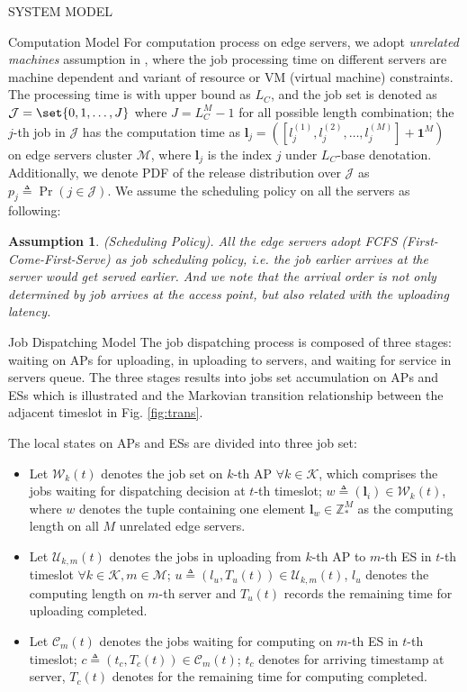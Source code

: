 \documentclass[10pt, conference, letterpaper]{IEEEtran}
\newtheorem{assumption}{Assumption}
\newcommand{\domZ}{\mathbb{Z}_{*}}
\newcommand{\vecOne}{\mathbf{1}}
\newcommand{\define}{\triangleq}
\renewcommand{\vec}{\mathbf}
\DeclarePairedDelimiter\set\{\}
\newcommand{\apSet}{\mathcal{K}}
\newcommand{\esSet}{\mathcal{M}}
\newcommand{\jSet}{\mathcal{J}}
\newcommand{\wSet}{\mathcal{W}}
\newcommand{\uSet}{\mathcal{U}}
\newcommand{\cSet}{\mathcal{C}}
\begin{document}
\begin{section}{SYSTEM MODEL}
        \begin{subsection}{Computation Model}
            For computation process on edge servers, we adopt \emph{unrelated machines} assumption in \cite{tan-online}, where the job processing time on different servers are machine dependent and variant of resource or VM (virtual machine) constraints. The processing time is with upper bound as $L_C$, and the job set is denoted as $\mathcal{J} = \set{0,1,\dots, J}$ where $J=L_C^M-1$ for all possible length combination; the $j$-th job in $\jSet$ has the computation time as $\vec{l}_j = ([l_j^{(1)}, l_j^{(2)}, \dots, l_j^{(M)}] + \vecOne^M)$ on edge servers cluster $\esSet$, where $\vec{l}_j$ is the index $j$ under $L_C$-base denotation. Additionally, we denote PDF of the release distribution over $\jSet$ as $p_j \define \Pr(j\in\jSet)$.
            We assume the scheduling policy on all the servers  as following:
            \begin{assumption}
                (Scheduling Policy).
                All the edge servers adopt \emph{FCFS} (First-Come-First-Serve) as job scheduling policy, i.e. the job earlier arrives at the server would get served earlier. And we note that the arrival order is not only determined by job arrives at the access point, but also related with the uploading latency.
            \end{assumption}
        \end{subsection}

        \begin{subsection}{Job Dispatching Model}
            The job dispatching process is composed of three stages: waiting on APs for uploading, in uploading to servers, and waiting for service in servers queue. The three stages results into jobs set accumulation on APs and ESs which is illustrated and the Markovian transition relationship between the adjacent timeslot in Fig. \ref{fig:trans}.

            The local states on APs and ESs are divided into three job set:
            \begin{itemize}
                \item Let $\wSet_{k}(t)$ denotes the job set on $k$-th AP $\forall k \in \apSet$, which comprises the jobs waiting for dispatching decision at $t$-th timeslot; $w \triangleq (\vec{l}_i) \in \wSet_{k}(t)$, where $w$ denotes the tuple containing one element $\vec{l}_w \in \domZ^M$ as the computing length on all $M$ unrelated edge servers.
                \item Let $\uSet_{k,m}(t)$ denotes the jobs in uploading from $k$-th AP to $m$-th ES in $t$-th timeslot $\forall k \in \apSet, m \in \esSet$; $u \triangleq (l_u, T_{u}(t)) \in \uSet_{k,m}(t)$, $l_u$ denotes the computing length on $m$-th server and $T_{u}(t)$ records the remaining time for uploading completed.
                \item Let $\cSet_{m}(t)$ denotes the jobs waiting for computing on $m$-th ES in $t$-th timeslot; $c \triangleq (t_c, T_{c}(t)) \in \cSet_{m}(t)$; $t_c$ denotes for arriving timestamp at server, $T_{c}(t)$ denotes for the remaining time for computing completed.
            \end{itemize}


\end{subsection}
\end{section}
\end{document}
